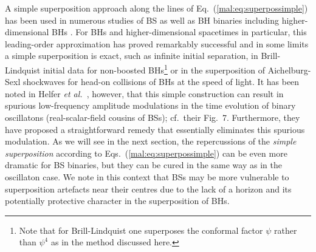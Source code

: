 A simple superposition approach along the lines
of Eq.~(\ref{mal:eq:superpossimple}) has been used in
numerous studies of BS as well as BH binaries
including higher-dimensional BHs
\cite{Palenzuela:2006wp,Palenzuela:2007dm,Shibata:2008rq,Okawa:2011fv,Palenzuela:2017kcg,Sperhake:2019oaw}. For BHs and higher-dimensional
spacetimes in particular, this leading-order approximation
has proved remarkably successful and in some limits
a simple superposition is
exact, such as infinite initial separation,
in Brill-Lindquist initial data for non-boosted
\setcounter{footnote}{6}
BHs\footnote{Note that for Brill-Lindquist one superposes the conformal
factor $\psi$ rather than $\psi^4$ as in the
method discussed here.}
\cite{Brill:1963yv}
or in the superposition of
Aichelburg-Sexl shockwaves \cite{Aichelburg:1970dh}
for head-on collisions of BHs at the speed of light.
It has been noted in Helfer {\em et al.}~\cite{Helfer:2018vtq}, however,
that this simple
construction can result in spurious low-frequency
amplitude modulations in the
time evolution of binary oscillatons (real-scalar-field cousins of BSs); cf.~their Fig.~7. Furthermore, they have proposed a
straightforward remedy that essentially eliminates this spurious
modulation. As we will see in the next section, the repercussions
of the {\it simple superposition} according to Eqs.~(\ref{mal:eq:superpossimple})
can be even more dramatic for BS binaries, but they can
be cured in the same way as in the oscillaton case.
We note in this context that BSs may be more vulnerable
to superposition artefacts near their centres
due to the lack of a horizon and
its potentially protective character in the superposition of
BHs.

